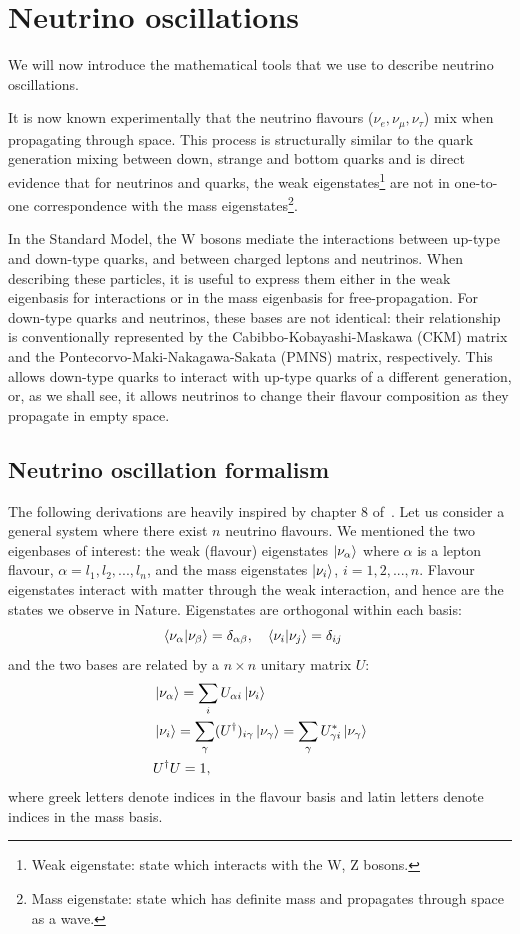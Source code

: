 \section{Neutrino oscillations}
We will now introduce the mathematical tools that we use to describe neutrino
oscillations. 

It is now known experimentally that 
the neutrino flavours ($\nu_e, \nu_\mu, \nu_\tau$) mix when propagating through
space\cite{superk}. This process is structurally similar to the quark generation
mixing between down, strange and bottom quarks and is direct evidence that for
neutrinos and quarks, the weak eigenstates\footnote{Weak eigenstate: state
which interacts with the W, Z bosons.} are not in one-to-one correspondence
with the mass eigenstates\footnote{Mass eigenstate: state which has definite
mass and propagates through space as a wave.}.

In the Standard Model, the W bosons mediate the interactions between up-type and
down-type quarks, and between charged leptons and neutrinos. 
When describing these particles, it is useful to express them either in the
weak eigenbasis for interactions or in the mass eigenbasis for
free-propagation.
For down-type quarks and neutrinos, these bases are not identical: their
relationship is conventionally represented by the Cabibbo-Kobayashi-Maskawa
(CKM) matrix and the Pontecorvo-Maki-Nakagawa-Sakata (PMNS) matrix,
respectively.  This allows down-type quarks to interact with up-type quarks of
a different generation, or, as we shall see, it allows neutrinos to change their
flavour composition as they propagate in empty space.


\subsection{Neutrino oscillation formalism} 
The following derivations are heavily inspired by chapter 8 of~\cite{zuber}.
Let us consider a general system where there exist $n$ neutrino flavours. 
We mentioned the two eigenbases of interest: the weak (flavour)
eigenstates $\ket{\nu_{\alpha}}$ where $\alpha$ is a lepton flavour,
$\alpha=l_1, l_2, ..., l_n$, and the mass eigenstates $\ket{\nu_i}$, $i=1, 2,
..., n$. 
Flavour eigenstates interact with matter through the weak interaction, and
hence are the states we observe in Nature. Eigenstates are orthogonal within
each basis:
$$
\bra{\nu_\alpha}\ket{\nu_\beta} = \delta_{\alpha \beta}, \quad
	\bra{\nu_i}\ket{\nu_j} = \delta_{ij}  \quad
$$
and the two bases are related by a $n\times n$ unitary matrix $U$:
\begin{align}
	&\ket{\nu_\alpha} = \sum_i U_{\alpha i} \ket{\nu_i}\label{eq:bases1}\\
	&\ket{\nu_i} = \sum_\gamma (U^\dagger)_{i \gamma} \ket{\nu_\gamma} = \sum_\gamma
			U^*_{\gamma i} \ket{\nu_\gamma}\label{eq:bases2}\\
	&U^\dagger U = 1, \nonumber
\end{align}
where greek letters denote indices in the flavour basis and latin letters
denote indices in the mass basis.

